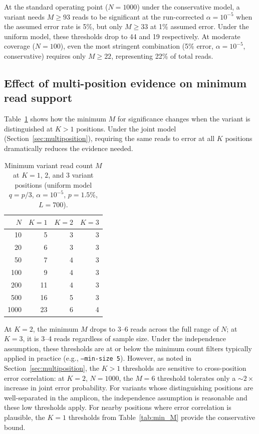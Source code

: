 \documentclass[11pt]{article}
\begin{document}
At the standard operating point ($N = 1000$) under the conservative model, a
variant needs $M \geq 93$ reads to be significant at the run-corrected
$\alpha = 10^{-5}$ when the assumed error rate is 5\%, but only $M \geq 33$ at
1\% assumed error. Under the uniform model, these thresholds drop to 44 and 19
respectively. At moderate coverage ($N = 100$), even the most stringent
combination (5\% error, $\alpha = 10^{-5}$, conservative) requires only
$M \geq 22$, representing 22\% of total reads.

\subsection{Effect of multi-position evidence on minimum read support}

Table~\ref{tab:min_M_K} shows how the minimum $M$ for significance changes when
the variant is distinguished at $K > 1$ positions. Under the joint model
(Section~\ref{sec:multiposition}), requiring the same reads to error at all $K$
positions dramatically reduces the evidence needed.

\begin{table}[htbp]
\centering
\caption{Minimum variant read count $M$ at $K = 1$, $2$, and $3$ variant
positions (uniform model $q = p/3$, $\alpha = 10^{-5}$, $p = 1.5\%$, $L = 700$).}
\label{tab:min_M_K}
\begin{tabular}{rrrr}
\toprule
$N$ & $K = 1$ & $K = 2$ & $K = 3$ \\
\midrule
10   &  5 &  3 &  3 \\
20   &  6 &  3 &  3 \\
50   &  7 &  4 &  3 \\
100  &  9 &  4 &  3 \\
200  & 11 &  4 &  3 \\
500  & 16 &  5 &  3 \\
1000 & 23 &  6 &  4 \\
\bottomrule
\end{tabular}
\end{table}

At $K = 2$, the minimum $M$ drops to 3--6 reads across the full range of $N$; at
$K = 3$, it is 3--4 reads regardless of sample size. Under the independence
assumption, these thresholds are at or below the minimum count filters typically
applied in practice (e.g., \texttt{--min-size~5}). However, as noted in
Section~\ref{sec:multiposition}, the $K > 1$ thresholds are sensitive to
cross-position error correlation: at $K = 2$, $N = 1000$, the $M = 6$ threshold
tolerates only a ${\sim}2{\times}$ increase in joint error probability. For
variants whose distinguishing positions are well-separated in the amplicon,
the independence assumption is reasonable and these low thresholds apply. For
nearby positions where error correlation is plausible, the $K = 1$ thresholds
from Table~\ref{tab:min_M} provide the conservative bound.
\end{document}
